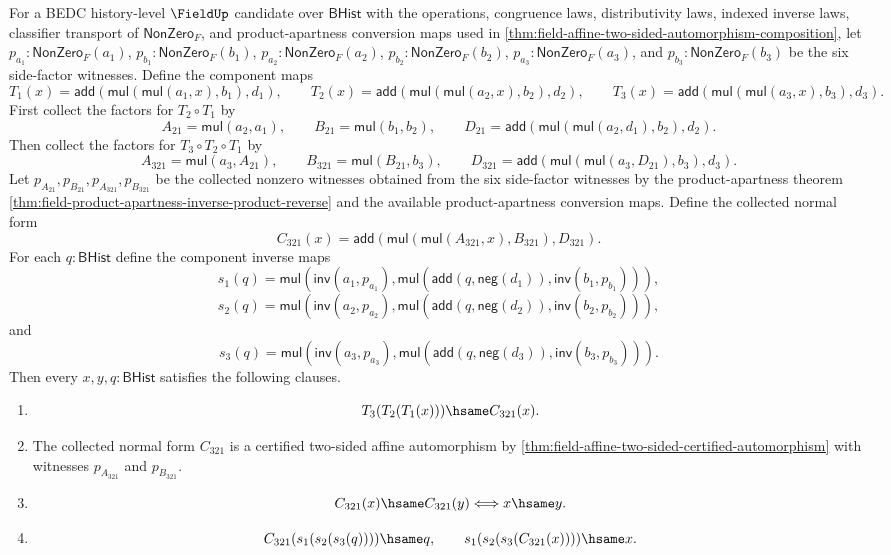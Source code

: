 \begin{theorem}
\label{thm:field-affine-threefold-certified-automorphism-composition}
For a BEDC history-level $\FieldUp$ candidate over $\mathsf{BHist}$ with the
operations, congruence laws, distributivity laws, indexed inverse laws,
classifier transport of $\mathsf{NonZero}_F$, and product-apartness conversion
maps used in
\autoref{thm:field-affine-two-sided-automorphism-composition}, let
$p_{a_1}:\mathsf{NonZero}_F(a_1)$, $p_{b_1}:\mathsf{NonZero}_F(b_1)$,
$p_{a_2}:\mathsf{NonZero}_F(a_2)$, $p_{b_2}:\mathsf{NonZero}_F(b_2)$,
$p_{a_3}:\mathsf{NonZero}_F(a_3)$, and
$p_{b_3}:\mathsf{NonZero}_F(b_3)$ be the six side-factor witnesses. Define
the component maps
$$
T_1(x)=\mathsf{add}(\mathsf{mul}(\mathsf{mul}(a_1,x),b_1),d_1),
\qquad
T_2(x)=\mathsf{add}(\mathsf{mul}(\mathsf{mul}(a_2,x),b_2),d_2),
\qquad
T_3(x)=\mathsf{add}(\mathsf{mul}(\mathsf{mul}(a_3,x),b_3),d_3).
$$
First collect the factors for $T_2\circ T_1$ by
$$
A_{21}=\mathsf{mul}(a_2,a_1),\qquad
B_{21}=\mathsf{mul}(b_1,b_2),\qquad
D_{21}=\mathsf{add}(\mathsf{mul}(\mathsf{mul}(a_2,d_1),b_2),d_2).
$$
Then collect the factors for $T_3\circ T_2\circ T_1$ by
$$
A_{321}=\mathsf{mul}(a_3,A_{21}),\qquad
B_{321}=\mathsf{mul}(B_{21},b_3),\qquad
D_{321}=\mathsf{add}(\mathsf{mul}(\mathsf{mul}(a_3,D_{21}),b_3),d_3).
$$
Let $p_{A_{21}},p_{B_{21}},p_{A_{321}},p_{B_{321}}$ be the collected nonzero
witnesses obtained from the six side-factor witnesses by the product-apartness
theorem
\autoref{thm:field-product-apartness-inverse-product-reverse} and the
available product-apartness conversion maps. Define the collected normal form
$$
C_{321}(x)=
\mathsf{add}(\mathsf{mul}(\mathsf{mul}(A_{321},x),B_{321}),D_{321}).
$$
For each $q:\mathsf{BHist}$ define the component inverse maps
$$
s_1(q)=
\mathsf{mul}(\mathsf{inv}(a_1,p_{a_1}),
\mathsf{mul}(\mathsf{add}(q,\mathsf{neg}(d_1)),\mathsf{inv}(b_1,p_{b_1}))),
$$
$$
s_2(q)=
\mathsf{mul}(\mathsf{inv}(a_2,p_{a_2}),
\mathsf{mul}(\mathsf{add}(q,\mathsf{neg}(d_2)),\mathsf{inv}(b_2,p_{b_2}))),
$$
and
$$
s_3(q)=
\mathsf{mul}(\mathsf{inv}(a_3,p_{a_3}),
\mathsf{mul}(\mathsf{add}(q,\mathsf{neg}(d_3)),\mathsf{inv}(b_3,p_{b_3}))).
$$
Then every $x,y,q:\mathsf{BHist}$ satisfies the following clauses.
\begin{enumerate}
\item

$$
T_3(T_2(T_1(x)))\hsame C_{321}(x).
$$
\item The collected normal form $C_{321}$ is a certified two-sided affine
automorphism by
\autoref{thm:field-affine-two-sided-certified-automorphism} with witnesses
$p_{A_{321}}$ and $p_{B_{321}}$.
\item

$$
C_{321}(x)\hsame C_{321}(y)\Longleftrightarrow x\hsame y.
$$
\item

$$
C_{321}(s_1(s_2(s_3(q))))\hsame q,
\qquad
s_1(s_2(s_3(C_{321}(x))))\hsame x.
$$
\end{enumerate}
\end{theorem}
